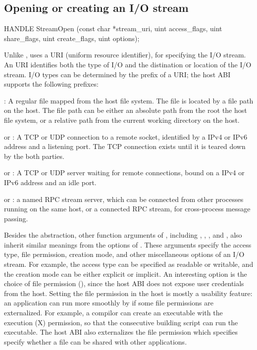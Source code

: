 \subsection*{Opening or creating an I/O stream}




\begin{paldef}
HANDLE StreamOpen (const char *stream_uri,
                   uint access_flags, uint share_flags,
                   uint create_flags, uint options);
\end{paldef}



Unlike ,  uses a URI (uniform resource identifier), for specifying the I/O stream.
An URI identifies both the type of I/O and the distination or location of the I/O stream.
I/O types can be determined by the prefix of a URI;
the host ABI supports the following prefixes:


\begin{compactitem}
\item {}: A regular file mapped from the host file system. The file is located by a file path on the host. The file path can be either an absolute path from the root the host file system, or a relative path from the current working directory on the host.
\item {} or : A TCP or UDP connection to a remote socket, identified by a IPv4 or IPv6 address and a listening port. The TCP connection exists until it is teared down by the both parties.
\item {} or : A TCP or UDP server waiting for remote connections, bound on a IPv4 or IPv6 address and an idle port.
\item {} or : a named RPC stream server, which can be connected from other processes running on the same host, 
or a connected RPC stream,
for cross-process message passing.
\end{compactitem}



Besides the abstraction,
other function arguments of , including , , , and ,
also inherit similar meanings from the options of .
These arguments specify the access type, file permission, creation mode, and other miscellaneous options of an I/O stream.
For example, the access type can be specified as readable or writable,
and the creation mode can be either explicit or implicit.
An interesting option is the choice of file permission (), since the host ABI does not expose user credentials
from the host.
Setting the file permission in the host
is mostly a usability feature: 
an application can run more smoothly by if some file permissions are externalized.
For example, a compilor can create an executable with the execution (X) permission, so that the consecutive building script can run the executable.
The host ABI also externalizes the file permission
which specifies specify whether a file can be shared with other applications.


